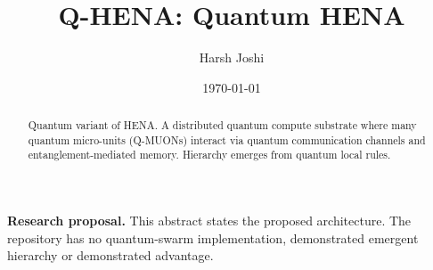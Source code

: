 \documentclass[twocolumn]{article}
\title{Q-HENA: Quantum HENA}
\author{Harsh Joshi}
\date{\today}
\begin{document}
\maketitle

\begin{abstract}
Quantum variant of HENA. A distributed quantum compute substrate where many
quantum micro-units (Q-MUONs) interact via quantum communication channels
and entanglement-mediated memory. Hierarchy emerges from quantum local rules.
\end{abstract}

\noindent\textbf{Research proposal.} This abstract states the proposed architecture. The repository has no quantum-swarm implementation, demonstrated emergent hierarchy or demonstrated advantage.



\end{document}
